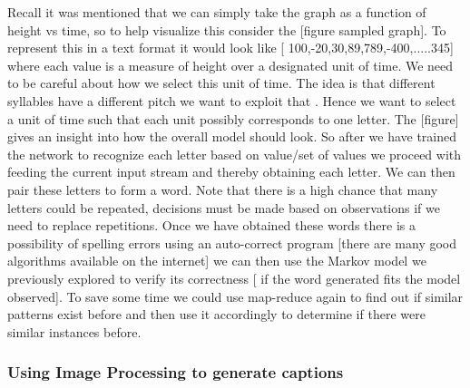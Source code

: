 \documentclass[sigconf]{acmart}
\begin{document}
Recall it was mentioned that we can simply take the graph as a function of height vs time, so to help visualize this consider the [figure sampled graph]. To represent this in a text format it would look like [ 100,-20,30,89,789,-400,.....345] where each value is a measure of height over a designated unit of time. We need to be careful about how we select this unit of time. The idea is that different syllables have a different pitch we want to exploit that \cite{2017a} . Hence we want to select a unit of time such that each unit possibly corresponds to one letter. The [figure] gives an insight into how the overall model should look. So after we have trained the network to recognize each letter based on value/set of values we proceed with feeding the current input stream and thereby obtaining each letter. We can then pair these letters to form a word. Note that there is a high chance that many letters could be repeated, decisions must be made based on observations if we need to replace repetitions. Once we have obtained these words there is a possibility of spelling errors using an auto-correct program [there are many good algorithms available on the internet] we can then use the Markov model we previously explored to verify its correctness [ if the word generated fits the model observed]. To save some time we could use map-reduce again to find out if similar patterns exist before and then use it accordingly to determine if there were similar instances before.

\subsubsection{Using Image Processing to generate captions}
\end{document}
